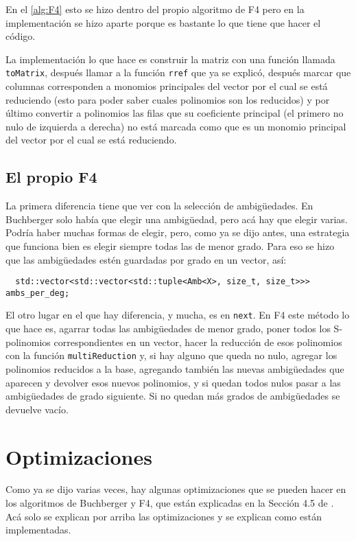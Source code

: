\documentclass[12pt]{report}
\theoremstyle{customstyle}
\theoremstyle{factstyle}
\begin{document}
En el \cref{alg:F4} esto se hizo dentro del propio algoritmo de F4 pero en la implementación se hizo aparte porque es bastante lo que tiene que hacer el código.

La implementación lo que hace es construir la matriz con una función llamada \texttt{toMatrix}, después llamar a la función \texttt{rref} que ya se explicó, después marcar que columnas corresponden a monomios principales del vector por el cual se está reduciendo (esto para poder saber cuales polinomios son los reducidos) y por último convertir a polinomios las filas que su coeficiente principal (el primero no nulo de izquierda a derecha) no está marcada como que es un monomio principal del vector por el cual se está reduciendo.

\subsection{El propio F4}

La primera diferencia tiene que ver con la selección de ambigüedades. En Buchberger solo había que elegir una ambigüedad, pero acá hay que elegir varias. Podría haber muchas formas de elegir, pero, como ya se dijo antes, una estrategia que funciona bien es elegir siempre todas las de menor grado. Para eso se hizo que las ambigüedades estén guardadas por grado en un vector, así:

\begin{verbatim}
  std::vector<std::vector<std::tuple<Amb<X>, size_t, size_t>>> ambs_per_deg;
\end{verbatim}

El otro lugar en el que hay diferencia, y mucha, es en \texttt{next}. En F4 este método lo que hace es, agarrar todas las ambigüedades de menor grado, poner todos los S-polinomios correspondientes en un vector, hacer la reducción de esos polinomios con la función \texttt{multiReduction} y, si hay alguno que queda no nulo, agregar los polinomios reducidos a la base, agregando también las nuevas ambigüedades que aparecen y devolver esos nuevos polinomios, y si quedan todos nulos pasar a las ambigüedades de grado siguiente. Si no quedan más grados de ambigüedades se devuelve vacío.

\section{Optimizaciones}\label{secton:optimizaciones}

Como ya se dijo varias veces, hay algunas optimizaciones que se pueden hacer en los algoritmos de Buchberger y F4, que están explicadas en la Sección 4.5 de \cite{thesis:Hof20}. Acá solo se explican por arriba las optimizaciones y se explican como están implementadas.
\end{document}

